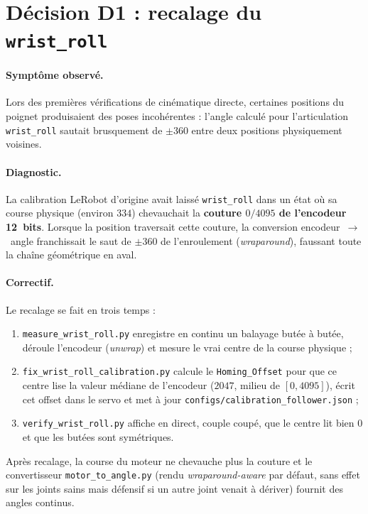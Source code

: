 \section{Décision D1 : recalage du \texttt{wrist\_roll}}
\label{ann:d1}

\paragraph{Symptôme observé.}
Lors des premières vérifications de cinématique directe, certaines positions
du poignet produisaient des poses incohérentes : l'angle calculé pour
l'articulation \texttt{wrist\_roll} sautait brusquement de $\pm 360$\textdegree{}
entre deux positions physiquement voisines.

\paragraph{Diagnostic.}
La calibration LeRobot d'origine avait laissé \texttt{wrist\_roll} dans un état
où sa course physique (environ $334$\textdegree{}) chevauchait la
\textbf{couture $0/4095$ de l'encodeur 12~bits}. Lorsque la position traversait
cette couture, la conversion encodeur~$\rightarrow$~angle franchissait le
saut de $\pm 360$\textdegree{} de l'enroulement (\emph{wraparound}), faussant
toute la chaîne géométrique en aval.

\paragraph{Correctif.}
Le recalage se fait en trois temps :
\begin{enumerate}
  \item \texttt{measure\_wrist\_roll.py} enregistre en continu un balayage
        butée à butée, déroule l'encodeur (\emph{unwrap}) et mesure le vrai
        centre de la course physique ;
  \item \texttt{fix\_wrist\_roll\_calibration.py} calcule le
        \texttt{Homing\_Offset} pour que ce centre lise la valeur médiane de
        l'encodeur ($2047$, milieu de $[0, 4095]$), écrit cet offset dans le
        servo et met à jour \texttt{configs/calibration\_follower.json} ;
  \item \texttt{verify\_wrist\_roll.py} affiche en direct, couple coupé, que le
        centre lit bien $0$\textdegree{} et que les butées sont symétriques.
\end{enumerate}
Après recalage, la course du moteur ne chevauche plus la couture et le
convertisseur \texttt{motor\_to\_angle.py} (rendu \emph{wraparound-aware} par
défaut, sans effet sur les joints sains mais défensif si un autre joint venait
à dériver) fournit des angles continus.

